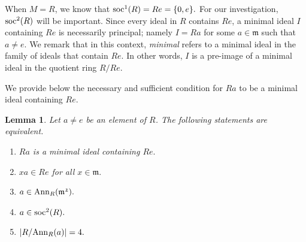 \documentclass[12pt, a4paper]{amsart}
\newtheorem{lem}[thm]{Lemma}
\theoremstyle{definition}
\newcommand{\Ann}{{\rm Ann}}
\numberwithin{equation}{section}
\newcommand{\soc}{{{\rm soc}}}
\begin{document}
When $M=R$, we know that $\soc^1(R)=Re=\{0,e\}.$ For our investigation, $\soc^2(R)$ will be important. Since every ideal in $R$ contains $Re$, a minimal ideal $I$ containing $Re$ is necessarily principal; namely $I=Ra$ for some $a \in \mathfrak{m}$ such that $a \neq e.$ We remark that in this context, \textit{minimal} refers to a minimal ideal in the family of ideals that contain $Re$. In other words, $I$ is a pre-image of a minimal ideal in the quotient ring $R/Re$. 


We provide below the necessary and sufficient condition for $Ra$ to be a minimal ideal containing $Re.$ 

\begin{lem} \label{lem:secondary_minimal}
\noindent
Let $a \neq e$ be an element of $R$. The following statements are equivalent. 
\begin{enumerate}
\item $Ra$ is a minimal ideal containing $Re.$
    \item  $xa \in Re$ for all $x \in \mathfrak{m}.$
    \item $a \in \Ann_{R}(\mathfrak{m^2}).$
    \item $a \in \soc^2(R).$
    \item $|R/\Ann_{R}(a)| = 4.$ 
\end{enumerate}
\end{lem}
\end{document}
